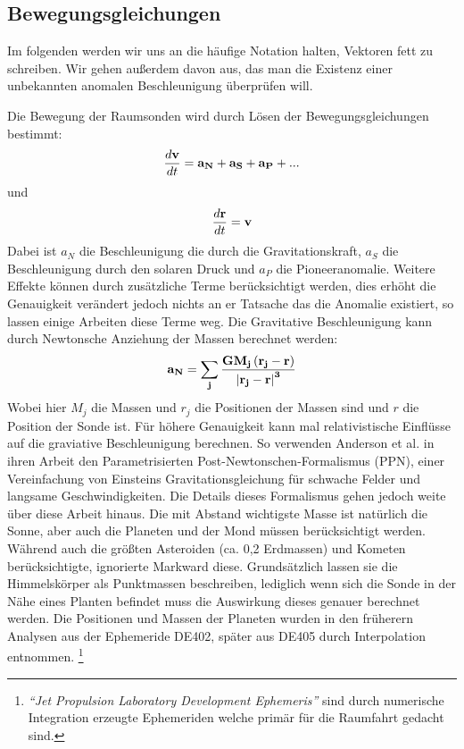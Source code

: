 
\subsection{Bewegungsgleichungen}
Im folgenden werden wir uns an die häufige Notation halten, Vektoren fett zu schreiben. Wir gehen außerdem davon aus, das man die Existenz einer unbekannten anomalen Beschleunigung überprüfen will.

Die Bewegung der Raumsonden wird durch Lösen der Bewegungsgleichungen  bestimmt:
\begin{equation}
\frac{d\bf{v}}{dt}=\bf{a_N} + \bf{a_S} + \bf{a_P} + ...
\end{equation}
und
\begin{equation}
\frac{d\bf{r}}{dt}=\bf{v}
\end{equation}
Dabei ist $a_N$ die Beschleunigung die durch die Gravitationskraft, $a_S$ die Beschleunigung durch den solaren Druck und $a_P$ die Pioneeranomalie.  Weitere Effekte können durch zusätzliche Terme berücksichtigt werden, dies erhöht die Genauigkeit verändert jedoch nichts an er Tatsache das die Anomalie existiert, so lassen einige Arbeiten diese Terme weg.
Die Gravitative Beschleunigung kann durch Newtonsche Anziehung der Massen berechnet werden:
\begin{equation}
\bf{a_N} = \sum_j \frac{GM_j\left(\bf{r_j}-\bf{r}\right)}{\left| \bf{r_j}-\bf{r} \right|^3}
\end{equation}
Wobei hier $M_j$ die Massen und $r_j$ die Positionen der Massen sind und $r$ die Position der Sonde ist.
Für höhere Genauigkeit kann mal relativistische Einflüsse auf die graviative Beschleunigung berechnen. So verwenden Anderson et al. in ihren Arbeit den Parametrisierten Post-Newtonschen-Formalismus (PPN), einer Vereinfachung von Einsteins Gravitationsgleichung für schwache Felder und langsame Geschwindigkeiten.
Die Details dieses Formalismus gehen jedoch weite über diese Arbeit hinaus.
Die mit Abstand wichtigste Masse ist natürlich die Sonne, aber auch die Planeten und der Mond müssen berücksichtigt werden. Während \cite{Anderson2002} auch die größten Asteroiden (ca. 0,2 Erdmassen) und Kometen berücksichtigte, ignorierte Markward diese. Grundsätzlich lassen sie die Himmelskörper als Punktmassen beschreiben, lediglich wenn sich die Sonde in der Nähe eines Planten befindet muss die Auswirkung dieses genauer berechnet werden.
Die Positionen und Massen der Planeten wurden in den früherern Analysen aus der Ephemeride
DE402, später aus DE405 durch Interpolation entnommen.
\footnote{\textit{``Jet Propulsion Laboratory Development Ephemeris''} sind durch
numerische Integration erzeugte Ephemeriden welche primär für die Raumfahrt gedacht sind.}\cite{Anderson2002}

